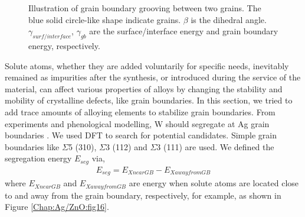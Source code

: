 \begingroup
\begin{figure}[!ht]
  \centering
  \caption[Illustration of grain boundary grooving effects.]{Illustration of grain boundary grooving between two grains. The blue solid circle-like shape indicate grains. $\beta$ is the dihedral angle. $\gamma_{surf/interface}$, $\gamma_{gb}$ are the surface/interface energy and grain boundary energy, respectively.}
  \label{Chap:Ag/ZnO:fig15}
\end{figure}
\endgroup


Solute atoms, whether they are added voluntarily for specific needs, inevitably remained as impurities after the synthesis, or introduced during the service of the material, can affect various properties of alloys by changing the stability and mobility of crystalline defects, like grain boundaries. In this section, we tried to add trace amounts of alloying elements to stabilize grain boundaries. From experiments and phenological modelling, W should segregate at Ag grain boundaries \cite{chookajorn2012design,jiao2018nanocrystalline}. We used \ac{DFT} to search for potential candidates. Simple grain boundaries like $\Sigma$5 (310), $\Sigma$3 (112) and $\Sigma$3 (111) are used. We defined the segregation energy $E_{seg}$ via,
\begin{align}
E_{seg} = E_{X near GB} - E_{X away from GB}
 \label{Chap:Ag/ZnO:eq:gb_seg}
\end{align}
where $E_{X near GB}$ and $E_{X away from GB}$ are energy when solute atoms are located close to and away from the grain boundary, respectively, for example, as shown in Figure \ref{Chap:Ag/ZnO:fig16}.


